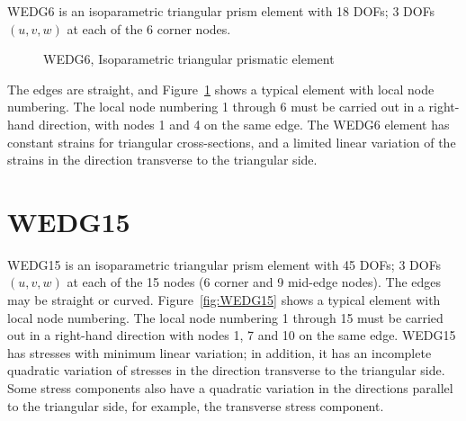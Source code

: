 WEDG6 is an isoparametric triangular prism element with 18 DOFs;
3 DOFs $(u,v,w)$ at each of the 6 corner nodes.
%
\begin{figure}[p]
\caption{WEDG6, Isoparametric triangular prismatic element}
\label{fig:WEDG6}
\end{figure}
%
The edges are straight, and Figure~\ref{fig:WEDG6} shows a typical
element with local node numbering.
The local node numbering 1 through 6 must be carried out in a right-hand
direction, with nodes 1 and 4 on the same edge.
The WEDG6 element has constant strains for triangular cross-sections, and
a limited linear variation of the strains in the direction transverse to the
triangular side.

\section{WEDG15}
\label{s:WEDG15}

WEDG15 is an isoparametric triangular prism element with 45 DOFs;
3 DOFs $(u,v,w)$ at each of the 15 nodes (6 corner and 9 mid-edge nodes).
The edges may be straight or curved.
Figure~\ref{fig:WEDG15} shows a typical element with local node numbering.
The local node numbering 1 through 15 must be carried out in a right-hand
direction with nodes 1, 7 and 10 on the same edge.
WEDG15 has stresses with minimum linear variation; in addition,
it has an incomplete quadratic variation of stresses in the direction transverse
to the triangular side.
Some stress components also have a quadratic variation in the directions
parallel to the triangular side, for example, the transverse stress component.

